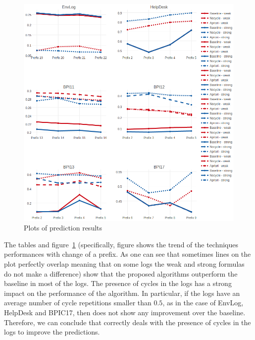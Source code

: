 \begin{figure}[!ht]
	\begin{center}  
		\includegraphics[width=\textwidth]{2_evaluation.png}
		\caption{Plots of prediction results}
		\label{figure:results}
	\end{center}
\end{figure}


The tables and figure~\ref{figure:results} (specifically, figure shows the trend of the techniques performances with change of a prefix. As one can see that sometimes lines on the plot perfectly overlap meaning that on some logs the weak and strong formulas do not make a difference) show that the proposed algorithms outperform the baseline in most of the logs.
The presence of cycles in the logs has a strong impact on the performance of the \nocycle algorithm. In particular, if the logs have an average number of cycle repetitions smaller than $0.5$, as in the case of EnvLog, HelpDesk and BPIC17, then \nocycle does not show any improvement over the baseline. Therefore, we can conclude that \nocycle correctly deals with the presence of cycles in the logs to improve the predictions.





